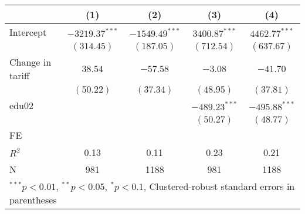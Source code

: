 
\begin{tabular}{l c c c c }
\hline
 & (1) & (2) & (3) & (4) \\
\hline
Intercept & $-3219.37^{***}$ & $-1549.49^{***}$ & $3400.87^{***}$ & $4462.77^{***}$ \\
            & $(314.45)$       & $(187.05)$       & $(712.54)$      & $(637.67)$      \\
Change in tariff     & $38.54$          & $-57.58$         & $-3.08$         & $-41.70$        \\
            & $(50.22)$        & $(37.34)$        & $(48.95)$       & $(37.81)$       \\
edu02       &                  &                  & $-489.23^{***}$ & $-495.88^{***}$ \\
            &                  &                  & $(50.27)$       & $(48.77)$       \\
\hline
FE          &                &                &                &                \\ 
\hline
$R^2$       & 0.13             & 0.11             & 0.23            & 0.21            \\
N           & 981              & 1188             & 981             & 1188            \\
\hline
\multicolumn{5}{l}{\scriptsize{$^{***}p<0.01$, $^{**}p<0.05$, $^*p<0.1$, Clustered-robust standard errors in parentheses}}
\end{tabular}
